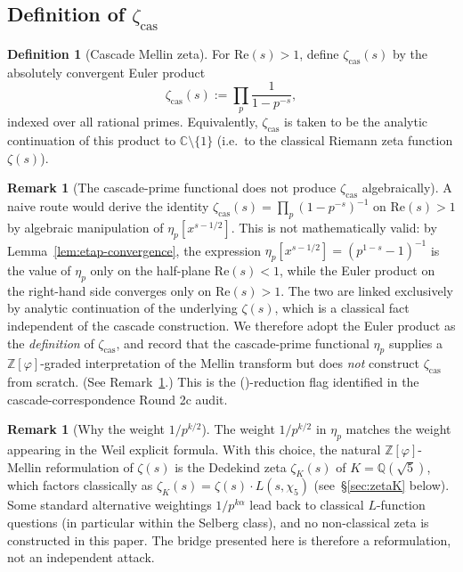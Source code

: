 \documentclass[11pt, a4paper]{amsart}
\theoremstyle{definition}
\newtheorem{definition}[theorem]{Definition}
\newtheorem{remark}[theorem]{Remark}
\newcommand{\Z}{\mathbb{Z}}
\newcommand{\Q}{\mathbb{Q}}
\newcommand{\C}{\mathbb{C}}
\newcommand{\pphi}{\varphi}
\newcommand{\zetacas}{\zeta_{\mathrm{cas}}}
\begin{document}
\subsection{Definition of $\zetacas$}

\begin{definition}[Cascade Mellin zeta]\label{def:zetacas}
For $\mathrm{Re}(s) > 1$, define $\zetacas(s)$ by the absolutely
convergent Euler product
\[
\zetacas(s) := \prod_p \frac{1}{1 - p^{-s}},
\]
indexed over all rational primes. Equivalently, $\zetacas$ is taken
to be the analytic continuation of this product to
$\C \setminus \{1\}$ (i.e.\ to the classical Riemann zeta function
$\zeta(s)$).
\end{definition}

\begin{remark}[The cascade-prime functional does not produce
$\zetacas$ algebraically]\label{rmk:zetacas-delta}
A naive route would derive the identity
$\zetacas(s) = \prod_p (1-p^{-s})^{-1}$ on $\mathrm{Re}(s) > 1$ by
algebraic manipulation of $\eta_p[x^{s-1/2}]$. This is not
mathematically valid: by Lemma~\ref{lem:etap-convergence}, the
expression $\eta_p[x^{s-1/2}] = (p^{1-s} - 1)^{-1}$ is the value of
$\eta_p$ only on the half-plane $\mathrm{Re}(s) < 1$, while the
Euler product on the right-hand side converges only on
$\mathrm{Re}(s) > 1$. The two are linked exclusively by analytic
continuation of the underlying $\zeta(s)$, which is a classical
fact independent of the cascade construction. We therefore adopt
the Euler product as the \emph{definition} of $\zetacas$, and
record that the cascade-prime functional $\eta_p$ supplies a
$\Z[\pphi]$-graded interpretation of the Mellin transform but does
\emph{not} construct $\zetacas$ from scratch. (See
Remark~\ref{rmk:weight-choice}.) This is the (\textdelta)-reduction
flag identified in the cascade-correspondence Round 2c audit.
\end{remark}

\begin{remark}[Why the weight $1/p^{k/2}$]\label{rmk:weight-choice}
The weight $1/p^{k/2}$ in $\eta_p$ matches the weight appearing in
the Weil explicit formula. With this choice, the natural
$\Z[\pphi]$-Mellin reformulation of $\zeta(s)$ is the Dedekind zeta
$\zeta_K(s)$ of $K = \Q(\sqrt{5})$, which factors classically as
$\zeta_K(s) = \zeta(s) \cdot L(s, \chi_5)$ (see~\S\ref{sec:zetaK}
below). Some standard alternative weightings $1/p^{k\alpha}$ lead
back to classical $L$-function questions (in particular within
the Selberg class), and no non-classical zeta is constructed in
this paper.  The bridge presented here is therefore a
reformulation, not an independent attack.
\end{remark}
\end{document}

